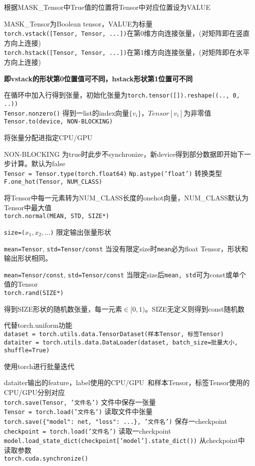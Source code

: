 \documentclass[UTF8]{ctexart}
\begin{document}
  根据MASK\_Tensor中True值的位置将Tensor中对应位置设为VALUE

  MASK\_Tensor为Boolean tensor，VALUE为标量\\
\texttt{torch.vstack([Tensor, Tensor, ...])}在第0维方向连接张量，(对矩阵即在竖直方向上连接)\\
\texttt{torch.hstack([Tensor, Tensor, ...])}在第1维方向连接张量，(对矩阵即在水平方向上连接)

  \textbf{即vstack的形状第0位置值可不同，hstack形状第1位置可不同}

  在循环中加入行得到张量，初始化张量为\texttt{torch.tensor([]).reshape((.., 0, ..))}\\
\texttt{Tensor.nonzero()} 得到一list的index向量$\{v_i\}$，$Tensor[v_i]$为非零值\\
\texttt{Tensor.to(device, NON-BLOCKING)} 

  将张量分配进指定CPU/GPU
  
  NON-BLOCKING 为true时此步不synchronize，新device得到部分数据即开始下一步计算。默认为false\\
\texttt{Tensor = Tensor.type(torch.float64)} \texttt{Np.astype('float')} 转换类型\\
\texttt{F.one\_hot(Tensor, NUM\_CLASS)} 

  将Tensor中每一元素转为NUM\_CLASS长度的onehot向量，NUM\_CLASS默认为Tensor中最大值\\
\texttt{torch.normal(MEAN, STD, SIZE*)}

  \texttt{size=($x_1, x_2, ...$)} 限定输出张量形状

  \texttt{mean=Tensor}, \texttt{std=Tensor/const} 当没有限定size时\texttt{mean}必为float Tensor，形状和输出形状相同。

  \texttt{mean=Tensor/const}, \texttt{std=Tensor/const} 当限定size后\texttt{mean, std}可为const或单个值的Tensor\\
\texttt{torch.rand(SIZE*)}

  得到SIZE形状的随机数张量，每一元素$\in [0,1)$。SIZE无定义则得到const随机数

  代替torch.uniform功能\\
\texttt{dataset = torch.utils.data.TensorDataset(样本Tensor, 标签Tensor)}\\
\texttt{dataiter = torch.utils.data.DataLoader(dataset, batch\_size=批量大小, shuffle=True)}

  使用torch进行批量迭代
  
  dataiter输出的feature，label使用的CPU/GPU\ 和样本Tensor，标签Tensor使用的CPU/GPU分别对应\\
\texttt{torch.save(Tensor, '文件名')} 文件中保存一张量\\
\texttt{Tensor = torch.load('文件名')} 读取文件中张量\\
\texttt{torch.save(\{"model": net, "loss": ...\}, '文件名')} 保存一checkpoint\\
\texttt{checkpoint = torch.load('文件名')} 读取一checkpoint\\
\texttt{model.load\_state\_dict(checkpoint['model'].state\_dict())} 从checkpoint中读取参数\\
\texttt{torch.cuda.synchronize()} 
\end{document}
